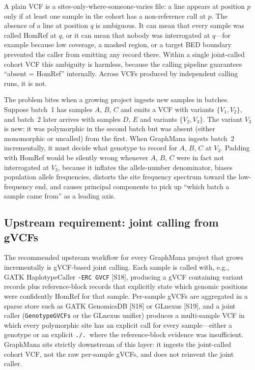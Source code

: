 \documentclass[11pt,a4paper]{article}
\begin{document}
A plain VCF is a sites-only-where-someone-varies file: a line appears at position $p$ only if at least one sample in the cohort has a non-reference call at $p$. The absence of a line at position $q$ is ambiguous. It can mean that every sample was called HomRef at $q$, or it can mean that nobody was interrogated at $q$---for example because low coverage, a masked region, or a target BED boundary prevented the caller from emitting any record there. Within a single joint-called cohort VCF this ambiguity is harmless, because the calling pipeline guarantees ``absent = HomRef'' internally. Across VCFs produced by independent calling runs, it is not.

The problem bites when a growing project ingests new samples in batches. Suppose batch~1 has samples $A$, $B$, $C$ and emits a VCF with variants $\{V_1, V_2\}$, and batch~2 later arrives with samples $D$, $E$ and variants $\{V_2, V_3\}$. The variant $V_3$ is new: it was polymorphic in the second batch but was absent (either monomorphic or uncalled) from the first. When GraphMana ingests batch~2 incrementally, it must decide what genotype to record for $A$, $B$, $C$ at $V_3$. Padding with HomRef would be silently wrong whenever $A$, $B$, $C$ were in fact not interrogated at $V_3$, because it inflates the allele-number denominator, biases population allele frequencies, distorts the site frequency spectrum toward the low-frequency end, and causes principal components to pick up ``which batch a sample came from'' as a leading axis.

\subsection*{Upstream requirement: joint calling from gVCFs}

The recommended upstream workflow for every GraphMana project that grows incrementally is gVCF-based joint calling. Each sample is called with, e.g., GATK HaplotypeCaller \texttt{-ERC GVCF} [S18], producing a gVCF containing variant records plus reference-block records that explicitly state which genomic positions were confidently HomRef for that sample. Per-sample gVCFs are aggregated in a sparse store such as GATK GenomicsDB [S18] or GLnexus [S19], and a joint caller (\texttt{GenotypeGVCFs} or the GLnexus unifier) produces a multi-sample VCF in which every polymorphic site has an explicit call for every sample---either a genotype or an explicit \texttt{./.}\ where the reference-block evidence was insufficient. GraphMana sits strictly downstream of this layer: it ingests the joint-called cohort VCF, not the raw per-sample gVCFs, and does not reinvent the joint caller.
\end{document}
